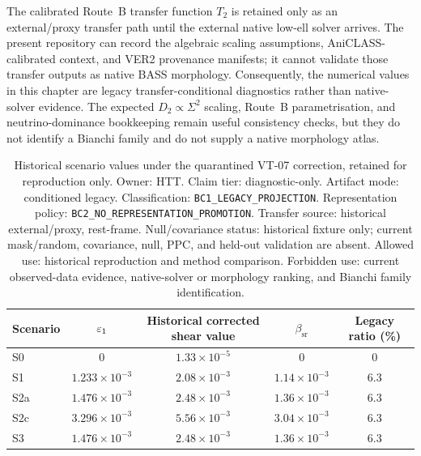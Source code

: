 The calibrated Route~B transfer function $T_2$ is retained only as an
external/proxy transfer path until the external native low-ell solver arrives.
The present repository can record the algebraic scaling assumptions,
AniCLASS-calibrated context, and VER2 provenance manifests; it cannot validate
those transfer outputs as native BASS morphology.  Consequently, the numerical
values in this chapter are legacy transfer-conditional diagnostics rather than
native-solver evidence.  The expected $D_2 \propto \Sigma^2$ scaling,
Route~B parametrisation, and neutrino-dominance bookkeeping remain useful
consistency checks, but they do not identify a Bianchi family and do not supply
a native morphology atlas.



\begin{table}[t]
\centering
\caption{Historical scenario values under the quarantined VT-07
correction, retained for reproduction only.  Owner: HTT.  Claim tier:
diagnostic-only.  Artifact mode: conditioned legacy.  Classification:
\texttt{BC1\_LEGACY\_PROJECTION}.  Representation policy:
\texttt{BC2\_NO\_REPRESENTATION\_PROMOTION}.  Transfer source:
historical external/proxy, rest-frame.  Null/covariance status:
historical fixture only; current mask/random, covariance, null, PPC, and
held-out validation are absent.  Allowed use: historical reproduction
and method comparison.  Forbidden use: current observed-data evidence,
native-solver or morphology ranking, and Bianchi family identification.}
\label{tab:scenario-dual}
\footnotesize
\begin{tabular}{lcccc}
\toprule
Scenario & $\varepsilon_1$ & Historical corrected shear value & $\beta_{\mathrm{sr}}$ & Legacy ratio (\%) \\
\midrule
S0  & $0$                   & $1.33 \times 10^{-5}$ & $0$ & $0$ \\
S1  & $1.233 \times 10^{-3}$ & $2.08 \times 10^{-3}$ & $1.14 \times 10^{-3}$ & $6.3$ \\
S2a & $1.476 \times 10^{-3}$ & $2.48 \times 10^{-3}$ & $1.36 \times 10^{-3}$ & $6.3$ \\
S2c & $3.296 \times 10^{-3}$ & $5.56 \times 10^{-3}$ & $3.04 \times 10^{-3}$ & $6.3$ \\
S3  & $1.476 \times 10^{-3}$ & $2.48 \times 10^{-3}$ & $1.36 \times 10^{-3}$ & $6.3$ \\
\bottomrule
\end{tabular}
\end{table}

